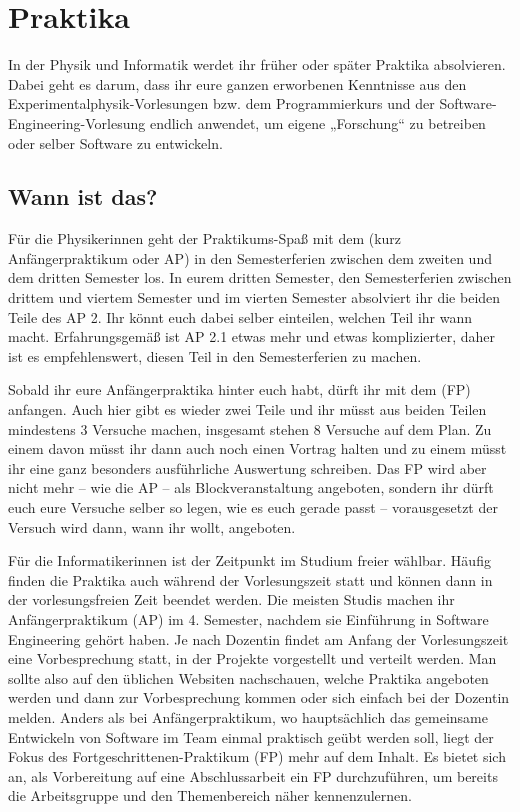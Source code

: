 \section{Praktika}

In der Physik und Informatik werdet ihr früher oder später Praktika absolvieren. Dabei geht es darum, dass ihr eure ganzen erworbenen Kenntnisse aus den Experimentalphysik-Vorlesungen bzw. dem Programmierkurs und der Software-Engineering-Vorlesung endlich anwendet, um eigene „Forschung“ zu betreiben oder selber Software zu entwickeln.

\subsection{Wann ist das?}

Für die Physikerinnen geht der Praktikums-Spaß mit dem  (kurz Anfängerpraktikum oder \gls{AP}) in den Semesterferien zwischen dem zweiten und dem dritten Semester los. In eurem dritten Semester, den Semesterferien zwischen drittem und viertem Semester und im vierten Semester absolviert ihr die beiden Teile des AP 2. Ihr könnt euch dabei selber einteilen, welchen Teil ihr wann macht. Erfahrungsgemäß ist AP 2.1 etwas mehr und etwas komplizierter, daher ist es empfehlenswert, diesen Teil in den Semesterferien zu machen.

Sobald ihr eure Anfängerpraktika hinter euch habt, dürft ihr mit dem  (\gls{FP}) anfangen. Auch hier gibt es wieder zwei Teile und ihr müsst aus beiden Teilen mindestens 3 Versuche machen, insgesamt stehen 8 Versuche auf dem Plan. Zu einem davon müsst ihr dann auch noch einen Vortrag halten und zu einem müsst ihr eine ganz besonders ausführliche Auswertung schreiben. Das \gls{FP} wird aber nicht mehr -- wie die \gls{AP} -- als Blockveranstaltung angeboten, sondern ihr dürft euch eure Versuche selber so legen, wie es euch gerade passt -- vorausgesetzt der Versuch wird dann, wann ihr wollt, angeboten.

Für die Informatikerinnen ist der Zeitpunkt im Studium freier wählbar. Häufig finden die Praktika auch während der Vorlesungszeit statt und können dann in der vorlesungsfreien Zeit beendet werden. Die meisten Studis machen ihr Anfängerpraktikum (\gls{AP}) im 4. Semester, nachdem sie Einführung in Software Engineering gehört haben. Je nach Dozentin findet am Anfang der Vorlesungszeit eine Vorbesprechung statt, in der Projekte vorgestellt und verteilt werden. Man sollte also auf den üblichen Websiten nachschauen, welche Praktika angeboten werden und dann zur Vorbesprechung kommen oder sich einfach bei der Dozentin melden.
Anders als bei Anfängerpraktikum, wo hauptsächlich das gemeinsame Entwickeln von Software im Team einmal praktisch geübt werden soll, liegt der Fokus des Fortgeschrittenen-Praktikum (\gls{FP}) mehr auf dem Inhalt. Es bietet sich an, als Vorbereitung auf eine Abschlussarbeit ein FP durchzuführen, um bereits die Arbeitsgruppe und den Themenbereich näher kennenzulernen.

